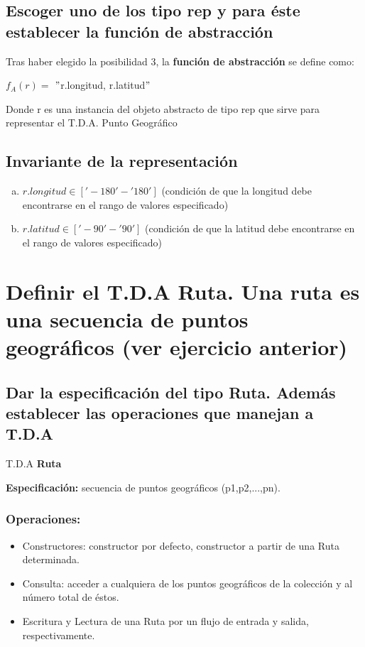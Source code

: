 \subsection{Escoger uno de los tipo rep y para éste establecer la función de abstracción}
Tras haber elegido la posibilidad 3, la \textbf{función de abstracción} se define como:\\
\begin{center}
	$ f_{A}(r) = $ $ " $r.longitud, r.latitud$ " $
\end{center}
Donde r es una instancia del objeto abstracto de tipo rep que sirve para representar el T.D.A. Punto Geográfico

\subsection{Invariante de la representación}
\begin{enumerate}[a)]
	\item $ r.longitud \in ['-180' - '180'] $ (condición de que la longitud debe encontrarse en el rango de valores especificado)
	\item $ r.latitud \in ['-90' - '90'] $ (condición de que la latitud debe encontrarse en el rango de valores especificado)
\end{enumerate}

\newpage

\section{Definir el T.D.A Ruta. Una ruta es una secuencia de puntos geográficos (ver ejercicio
	anterior)}
\subsection{Dar la especificación del tipo Ruta. Además establecer las operaciones que manejan
	a T.D.A}
T.D.A \textbf{Ruta}

\textbf{Especificación:} secuencia de puntos geográficos (p1,p2,...,pn).

\subsubsection{Operaciones:}
\begin{itemize}
	\item Constructores: constructor por defecto, constructor a partir de una Ruta determinada.
	\item Consulta: acceder a cualquiera de los puntos geográficos de la colección y al número total de éstos.
	\item Escritura y Lectura de una Ruta por un flujo de entrada y salida, respectivamente.
\end{itemize}

